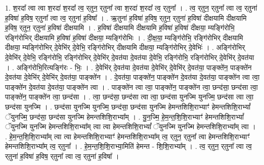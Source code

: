 \documentclass[17pt]{extarticle}
\begin{document}
1. श॒रदा᳚ त्वा त्वा श॒रदा॑ श॒रदा᳚ त्व॒ र्‌तुन॒ र्‌तुना᳚ त्वा श॒रदा॑ श॒रदा᳚ त्व॒ र्‌तुना᳚ । . त्व॒ र्‌तुन॒ र्‌तुना᳚ त्वा त्व॒ र्‌तुना॑ ह॒विषा॑ ह॒विष॒ र्‌तुना᳚ त्वा त्व॒ र्‌तुना॑ ह॒विषा᳚ । . ऋ॒तुना॑ ह॒विषा॑ ह॒विष॒ र्‌तुन॒ र्‌तुना॑ ह॒विषा॑ दीक्षयामि दीक्षयामि ह॒विष॒ र्‌तुन॒ र्‌तुना॑ ह॒विषा॑ दीक्षयामि । . ह॒विषा॑ दीक्षयामि दीक्षयामि ह॒विषा॑ ह॒विषा॑ दीक्षया॒ म्यङ्गि॑रोभि॒ रङ्गि॑रोभिर् दीक्षयामि ह॒विषा॑ ह॒विषा॑ दीक्षया॒ म्यङ्गि॑रोभिः । . दी॒क्ष॒या॒ म्यङ्गि॑रोभि॒ रङ्गि॑रोभिर् दीक्षयामि दीक्षया॒ म्यङ्गि॑रोभिर् दे॒वेभि॑र् दे॒वेभि॒ रङ्गि॑रोभिर् दीक्षयामि दीक्षया॒ म्यङ्गि॑रोभिर् दे॒वेभिः॑ । . अङ्गि॑रोभिर् दे॒वेभि॑र् दे॒वेभि॒ रङ्गि॑रोभि॒ रङ्गि॑रोभिर् दे॒वेभि॑र् दे॒वत॑या दे॒वत॑या दे॒वेभि॒ रङ्गि॑रोभि॒ रङ्गि॑रोभिर् दे॒वेभि॑र् दे॒वत॑या । . अङ्गि॑रोभि॒रित्यङ्गि॑रः - भिः॒ । . दे॒वेभि॑र् दे॒वत॑या दे॒वत॑या दे॒वेभि॑र् दे॒वेभि॑र् दे॒वत॑या॒ पाङ्क्ते॑न॒ पाङ्क्ते॑न दे॒वत॑या दे॒वेभि॑र् दे॒वेभि॑र् दे॒वत॑या॒ पाङ्क्ते॑न । . दे॒वत॑या॒ पाङ्क्ते॑न॒ पाङ्क्ते॑न दे॒वत॑या दे॒वत॑या॒ पाङ्क्ते॑न त्वा त्वा॒ पाङ्क्ते॑न दे॒वत॑या दे॒वत॑या॒ पाङ्क्ते॑न त्वा । . पाङ्क्ते॑न त्वा त्वा॒ पाङ्क्ते॑न॒ पाङ्क्ते॑न त्वा॒ छन्द॑सा॒ छन्द॑सा त्वा॒ पाङ्क्ते॑न॒ पाङ्क्ते॑न त्वा॒ छन्द॑सा । . त्वा॒ छन्द॑सा॒ छन्द॑सा त्वा त्वा॒ छन्द॑सा युनज्मि युनज्मि॒ छन्द॑सा त्वा त्वा॒ छन्द॑सा युनज्मि । . छन्द॑सा युनज्मि युनज्मि॒ छन्द॑सा॒ छन्द॑सा युनज्मि हेमन्तशिशि॒राभ्याꣳ॑ हेमन्तशिशि॒राभ्यां᳚ ॅयुनज्मि॒ छन्द॑सा॒ छन्द॑सा युनज्मि हेमन्तशिशि॒राभ्या᳚म् । . यु॒न॒ज्मि॒ हे॒म॒न्त॒शि॒शि॒राभ्याꣳ॑ हेमन्तशिशि॒राभ्यां᳚ ॅयुनज्मि युनज्मि हेमन्तशिशि॒राभ्या᳚म् त्वा त्वा हेमन्तशिशि॒राभ्यां᳚ ॅयुनज्मि युनज्मि हेमन्तशिशि॒राभ्या᳚म् त्वा । . हे॒म॒न्त॒शि॒शि॒राभ्या᳚म् त्वा त्वा हेमन्तशिशि॒राभ्याꣳ॑ हेमन्तशिशि॒राभ्या᳚म् त्व॒ र्‌तुन॒ र्‌तुना᳚ त्वा हेमन्तशिशि॒राभ्याꣳ॑ हेमन्तशिशि॒राभ्या᳚म् त्व॒ र्‌तुना᳚ । . हे॒म॒न्त॒शि॒शि॒राभ्या॒मिति॑ हेमन्त - शि॒शि॒राभ्या᳚म् । . त्व॒ र्‌तुन॒ र्‌तुना᳚ त्वा त्व॒ र्‌तुना॑ ह॒विषा॑ ह॒विष॒ र्‌तुना᳚ त्वा त्व॒ र्‌तुना॑ ह॒विषा᳚ । \newline
\end{document}
